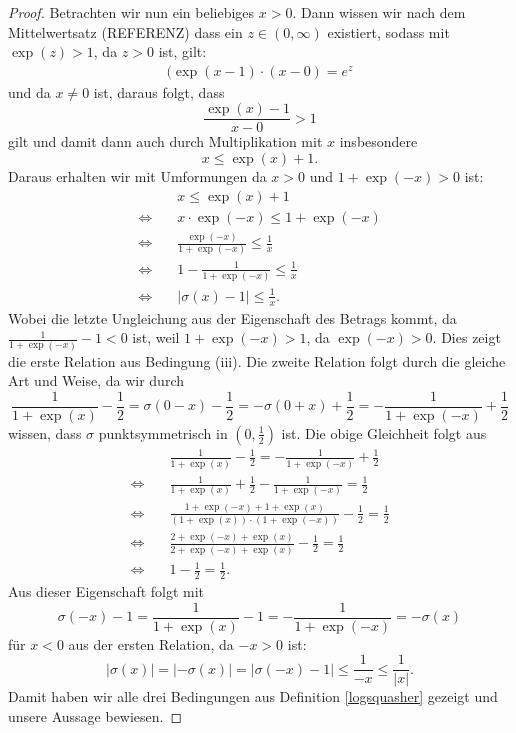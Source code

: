 \begin{proof}
Betrachten wir nun ein beliebiges $x > 0$. Dann wissen wir nach dem Mittelwertsatz (REFERENZ) dass ein $z \in (0, \infty)$ existiert, sodass mit $\exp(z) > 1$, da $z > 0$ ist, gilt$\colon$
\begin{equation*}
\begin{split}
(\exp(x - 1) \cdot (x - 0) = e^z
\end{split}
\end{equation*} 
und da $x \neq 0$ ist, daraus folgt, dass $$\frac{\exp(x) - 1}{x - 0} > 1$$ gilt und damit dann auch durch Multiplikation mit $x$ insbesondere $$ x \leq \exp(x) + 1.$$ Daraus erhalten wir mit Umformungen da $x > 0$ und $1 + \exp(-x) > 0$ ist$\colon$
\begin{equation*}
\begin{split}
& \quad x \leq \exp(x) + 1 \\
 \Leftrightarrow & \quad x \cdot \exp(-x) \leq 1 + \exp(-x) \\
 \Leftrightarrow & \quad \frac{\exp(-x)}{1 + \exp(-x)} \leq \frac{1}{x} \\
 \Leftrightarrow & \quad 1 - \frac{1}{1 + \exp(-x)} \leq \frac{1}{x} \\
 \Leftrightarrow & \quad |\sigma(x) - 1| \leq \frac{1}{x}.
\end{split}
\end{equation*}
Wobei die letzte Ungleichung aus der Eigenschaft des Betrags kommt, da $\frac{1}{1 + \exp(-x)} - 1< 0$ ist, weil $1 + \exp(-x) > 1$, da $\exp(-x) > 0$. Dies zeigt die erste Relation aus Bedingung (iii).
Die zweite Relation folgt durch die gleiche Art und Weise, da wir durch $$\frac{1}{1 + \exp(x)} - \frac{1}{2}= \sigma(0 - x) - \frac{1}{2} = -\sigma(0 + x) + \frac{1}{2} = -\frac{1}{1 + \exp(-x)} + \frac{1}{2}$$ 
wissen, dass $\sigma$ punktsymmetrisch in $(0, \frac{1}{2})$ ist. Die obige Gleichheit folgt aus
\begin{equation*}
\begin{split}
 & \quad \frac{1}{1 + \exp(x)} - \frac{1}{2} = -\frac{1}{1 + \exp(-x)} + \frac{1}{2} \\
 \Leftrightarrow  & \quad \frac{1}{1 + \exp(x)} + \frac{1}{2} -\frac{1}{1 + \exp(-x)} = \frac{1}{2}\\
 \Leftrightarrow & \quad  \frac{1 + \exp(-x) + 1 + \exp(x)}{(1 + \exp(x)) \cdot (1 + \exp(-x))} - \frac{1}{2} = \frac{1}{2} \\
 \Leftrightarrow & \quad \frac{2 + \exp(-x) + \exp(x)}{2 + \exp(-x) + \exp(x)} - \frac{1}{2} = \frac{1}{2} \\
 \Leftrightarrow & \quad 1 - \frac{1}{2} = \frac{1}{2}.
\end{split}
\end{equation*}
Aus dieser Eigenschaft folgt mit $$\sigma(- x) - 1 = \frac{1}{1 + \exp(x)} - 1 = -\frac{1}{1 + \exp(-x)} = -\sigma(x)$$ für $x < 0$ aus der ersten Relation, da $-x > 0 $ ist$\colon$  
$$|\sigma(x)| = |-\sigma(x)| = |\sigma(- x) - 1| \leq \frac{1}{-x} \leq \frac{1}{|x|}.$$
Damit haben wir alle drei Bedingungen aus Definition \ref{logsquasher} gezeigt und unsere Aussage bewiesen.
\end{proof}
